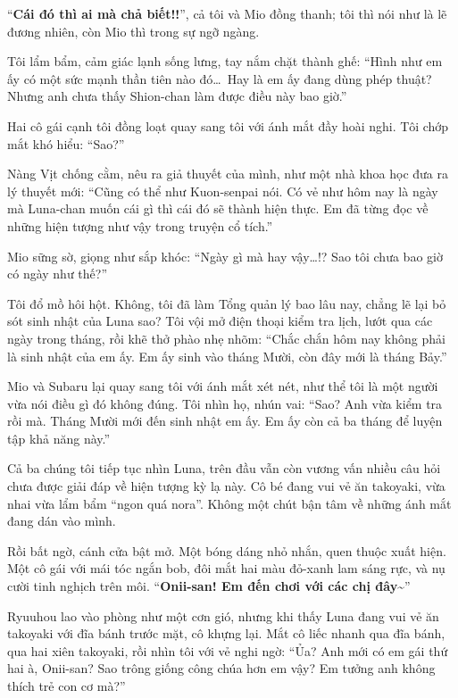 \documentclass[../main.tex]{subfiles}
\begin{document}
``\textbf{Cái đó thì ai mà chả biết!!}'', cả tôi và Mio đồng thanh; tôi thì nói như là lẽ đương nhiên, còn Mio thì trong sự ngỡ ngàng.

Tôi lẩm bẩm, cảm giác lạnh sống lưng, tay nắm chặt thành ghế: ``Hình như em ấy có một sức mạnh thần tiên nào đó\dots\ Hay là em ấy đang dùng phép thuật? Nhưng anh chưa thấy Shion-chan làm được điều này bao giờ.''

Hai cô gái cạnh tôi đồng loạt quay sang tôi với ánh mắt đầy hoài nghi. Tôi chớp mắt khó hiểu: ``Sao?''

Nàng Vịt chống cằm, nêu ra giả thuyết của mình, như một nhà khoa học đưa ra lý thuyết mới: ``Cũng có thể như Kuon-senpai nói. Có vẻ như hôm nay là ngày mà Luna-chan muốn cái gì thì cái đó sẽ thành hiện thực. Em đã từng đọc về những hiện tượng như vậy trong truyện cổ tích.''

Mio sững sờ, giọng như sắp khóc: ``Ngày gì mà hay vậy\dots!? Sao tôi chưa bao giờ có ngày như thế?''

Tôi đổ mồ hôi hột. Không, tôi đã làm Tổng quản lý bao lâu nay, chẳng lẽ lại bỏ sót sinh nhật của Luna sao? Tôi vội mở điện thoại kiểm tra lịch, lướt qua các ngày trong tháng, rồi khẽ thở phào nhẹ nhõm: ``Chắc chắn hôm nay không phải là sinh nhật của em ấy. Em ấy sinh vào tháng Mười, còn đây mới là tháng Bảy.''

Mio và Subaru lại quay sang tôi với ánh mắt xét nét, như thể tôi là một người vừa nói điều gì đó không đúng. Tôi nhìn họ, nhún vai: ``Sao? Anh vừa kiểm tra rồi mà. Tháng Mười mới đến sinh nhật em ấy. Em ấy còn cả ba tháng để luyện tập khả năng này.''

Cả ba chúng tôi tiếp tục nhìn Luna, trên đầu vẫn còn vương vấn nhiều câu hỏi chưa được giải đáp về hiện tượng kỳ lạ này. Cô bé đang vui vẻ ăn takoyaki, vừa nhai vừa lẩm bẩm ``ngon quá nora''. Không một chút bận tâm về những ánh mắt đang dán vào mình.

Rồi bất ngờ, cánh cửa bật mở. Một bóng dáng nhỏ nhắn, quen thuộc xuất hiện. Một cô gái với mái tóc ngắn bob, đôi mắt hai màu đỏ-xanh lam sáng rực, và nụ cười tinh nghịch trên môi. ``\textbf{Onii-san! Em đến chơi với các chị đây\~{}}''

Ryuuhou lao vào phòng như một cơn gió, nhưng khi thấy Luna đang vui vẻ ăn takoyaki với đĩa bánh trước mặt, cô khựng lại. Mắt cô liếc nhanh qua đĩa bánh, qua hai xiên takoyaki, rồi nhìn tôi với vẻ nghi ngờ: ``Ủa? Anh mới có em gái thứ hai à, Onii-san? Sao trông giống công chúa hơn em vậy? Em tưởng anh không thích trẻ con cơ mà?''
\end{document}
